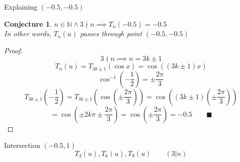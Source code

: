 \documentclass{beamer}
\newtheorem{conjecture}{Conjecture}
\begin{document}
\begin{frame}{Explaining $(-0.5,-0.5)$}
 \begin{conjecture}\center
  \vspace{-12pt}
  $n\in\mathbb{N} \land 3\nmid n \implies T_n(-0.5)=-0.5$ \\
  In other words, $T_n(u)$ passes through point $(-0.5,-0.5)$ \\[12pt]
 \end{conjecture}
 \pause
 \begin{proof}
  \vspace{-12pt}
  \[3\nmid n\implies n=3k\pm 1\] \pause
  \vspace{-12pt}
  \[T_n(u)=T_{3k\pm 1}(\cos{x})=\cos{((3k\pm 1)x)}\] \pause
  \vspace{-12pt}
  \[\cos^{-1}(-\frac{1}{2})=\pm\frac{2\pi}{3}\] \pause
  \vspace{-6pt}
  \[T_{3k\pm 1}(-\frac{1}{2})=T_{3k\pm 1}\left(\cos{\left(\pm \frac{2\pi}{3}\right)}\right)=\cos{\left((3k\pm 1)\left(\pm\frac{2\pi}{3}\right)\right)}\]\pause
  \vspace{-6pt}
  \[=\cos{\left(\pm 2k\pi\pm \frac{2\pi}{3}\right)}=\cos{\left(\pm \frac{2\pi}{3}\right)}=-0.5\qquad \blacksquare\]
  \vspace{6pt}
 \end{proof}
\end{frame}

\begin{frame}{Intersection $(-0.5,1)$}
 \vspace{-12pt}
 \[T_3(u), T_6(u), T_9(u)\qquad (3| n)\]
\end{frame}
\end{document}
